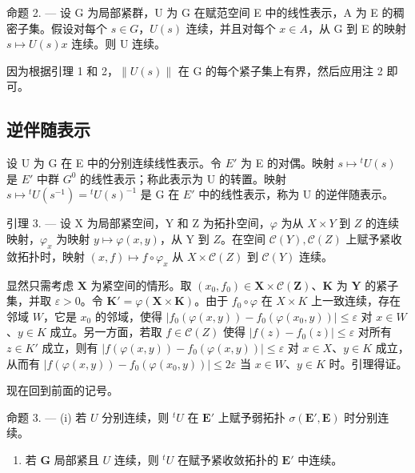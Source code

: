 命题 2. --- 设 G 为局部紧群，U 为 G 在赋范空间 E 中的线性表示，A 为 E 的稠密子集。假设对每个 \(s \in G\)，\(U(s)\) 连续，并且对每个 \(x \in A\)，从 G 到 E 的映射 \(s \mapsto U(s)x\) 连续。则 U 连续。

因为根据引理 1 和 2，\(\|U(s)\|\) 在 G 的每个紧子集上有界，然后应用注 2 即可。

\subsection{逆伴随表示}

设 U 为 G 在 E 中的分别连续线性表示。令 \(E'\) 为 E 的对偶。映射 \(s \mapsto {}^{t}U(s)\) 是 \(E'\) 中群 \(G^{0}\) 的线性表示；称此表示为 U 的转置。映射 \(s \mapsto {}^{t}U(s^{-1}) = {}^{t}U(s)^{-1}\) 是 G 在 \(E'\) 中的线性表示，称为 U 的逆伴随表示。

引理 3. --- 设 X 为局部紧空间，Y 和 Z 为拓扑空间，\(\varphi\) 为从 \(X \times Y\) 到 \(Z\) 的连续映射，\(\varphi_x\) 为映射 \(y \mapsto \varphi(x, y)\)，从 Y 到 \(Z\)。在空间 \(\mathcal{C}(Y), \mathcal{C}(Z)\) 上赋予紧收敛拓扑时，映射 \((x, f) \mapsto f \circ \varphi_x\) 从 \(X \times \mathcal{C}(Z)\) 到 \(\mathcal{C}(Y)\) 连续。

显然只需考虑 \(\mathbf{X}\) 为紧空间的情形。取 \((x_0, f_0) \in \mathbf{X} \times \mathcal{C}(\mathbf{Z})\)、\(\mathbf{K}\) 为 \(\mathbf{Y}\) 的紧子集，并取 \(\varepsilon > 0\)。令 \(\mathbf{K}' = \varphi(\mathbf{X} \times \mathbf{K})\)。由于 \(f_0 \circ \varphi\) 在 \(X \times K\) 上一致连续，存在邻域 \(W\)，它是 \(x_0\) 的邻域，使得 \(|f_0(\varphi(x, y)) - f_0(\varphi(x_0, y))| \leqslant \varepsilon\) 对 \(x \in W\)、\(y \in K\) 成立。另一方面，若取 \(f \in \mathcal{C}(Z)\) 使得 \(|f(z) - f_0(z)| \leqslant \varepsilon\) 对所有 \(z \in K'\) 成立，则有 \(|f(\varphi(x, y)) - f_0(\varphi(x, y))| \leqslant \varepsilon\) 对 \(x \in X\)、\(y \in K\) 成立，从而有 \(|f(\varphi(x, y)) - f_0(\varphi(x_0, y))| \leqslant 2\varepsilon\) 当 \(x \in W\)、\(y \in K\) 时。引理得证。

现在回到前面的记号。

命题 3. --- (i) 若 \(U\) 分别连续，则 \({}^t U\) 在 \(\mathbf{E}'\) 上赋予弱拓扑 \(\sigma(\mathbf{E}',\mathbf{E})\) 时分别连续。

\begin{enumerate}
\def\labelenumi{(\roman{enumi})}
\setcounter{enumi}{1}
\tightlist
\item
  若 \(\mathbf{G}\) 局部紧且 \(U\) 连续，则 \({}^t U\) 在赋予紧收敛拓扑的 \(\mathbf{E}'\) 中连续。
\end{enumerate}

